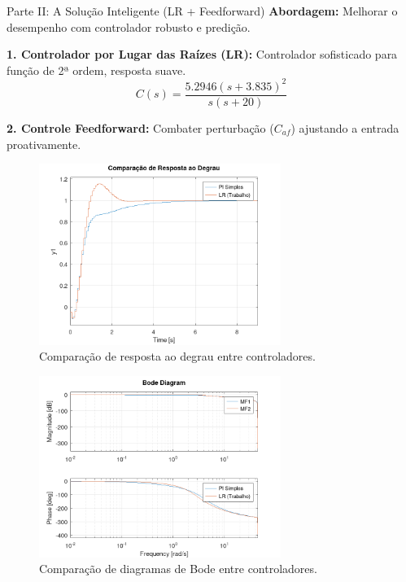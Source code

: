 \documentclass{beamer}
\begin{document}
\begin{frame}{Parte II: A Solução Inteligente (LR + Feedforward)}
    \normalsize \textbf{Abordagem:} Melhorar o desempenho com controlador robusto e predição.
    \vspace{0.01em}
    
    \scriptsize
    \textbf{1. Controlador por Lugar das Raízes (LR):} Controlador sofisticado para função de 2ª ordem, resposta suave.
    \tiny \[ C(s)=\frac{5.2946(s+3.835)^2}{s(s+20)} \]
    
    \vspace{0.01em}
    \scriptsize
    \textbf{2. Controle Feedforward:} Combater perturbação (\(C_{af}\)) ajustando a entrada proativamente.
    
    \begin{figure}
        \centering
        \includegraphics[width=0.7\textwidth]{figura_comparacao_step.png}
        \caption{\tiny Comparação de resposta ao degrau entre controladores.}
    \end{figure}
    \begin{figure}
        \centering
        \includegraphics[width=0.7\textwidth]{figura_comparacao_bode.png}
        \caption{\tiny Comparação de diagramas de Bode entre controladores.}
    \end{figure}
    
\end{frame}
\end{document}
